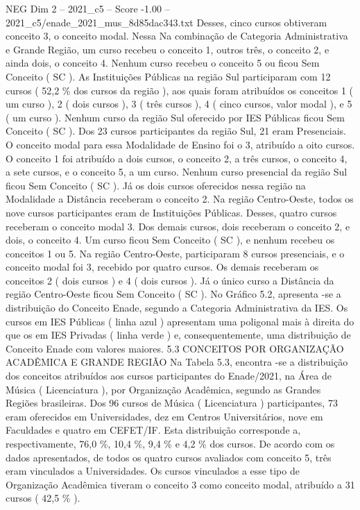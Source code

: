 \begin{textsample}{NEG Dim 2 – 2021\_c5 – Score -1.00 – 2021\_c5/enade\_2021\_mus\_8d85dac343.txt}
Desses, cinco cursos obtiveram conceito 3, o conceito modal.
Nessa Na combinação de Categoria Administrativa e Grande Região, um curso recebeu o conceito 1, outros três, o conceito 2, e ainda dois, o conceito 4.
Nenhum curso recebeu o conceito 5 ou ficou Sem Conceito ( SC ).
As Instituições Públicas na região Sul participaram com 12 cursos ( 52,2 \% dos cursos da região ), aos quais foram atribuídos os conceitos 1 ( um curso ), 2 ( dois cursos ), 3 ( três cursos ), 4 ( cinco cursos, valor modal ), e 5 ( um curso ).
Nenhum curso da região Sul oferecido por IES Públicas ficou Sem Conceito ( SC ).
Dos 23 cursos participantes da região Sul, 21 eram Presenciais.
O conceito modal para essa Modalidade de Ensino foi o 3, atribuído a oito cursos.
O conceito 1 foi atribuído a dois cursos, o conceito 2, a três cursos, o conceito 4, a sete cursos, e o conceito 5, a um curso.
Nenhum curso presencial da região Sul ficou Sem Conceito ( SC ).
Já os dois cursos oferecidos nessa região na Modalidade a Distância receberam o conceito 2.
Na região Centro-Oeste, todos os nove cursos participantes eram de Instituições Públicas.
Desses, quatro cursos receberam o conceito modal 3.
Dos demais cursos, dois receberam o conceito 2, e dois, o conceito 4.
Um curso ficou Sem Conceito ( SC ), e nenhum recebeu os conceitos 1 ou 5.
Na região Centro-Oeste, participaram 8 cursos presenciais, e o conceito modal foi 3, recebido por quatro cursos.
Os demais receberam os conceitos 2 ( dois cursos ) e 4 ( dois cursos ).
Já o único curso a Distância da região Centro-Oeste ficou Sem Conceito ( SC ).
No Gráfico 5.2, apresenta -se a distribuição do Conceito Enade, segundo a Categoria Administrativa da IES.
Os cursos em IES Públicas ( linha azul ) apresentam uma poligonal mais à direita do que os em IES Privadas ( linha verde ) e, consequentemente, uma distribuição de Conceito Enade com valores maiores. 5.3 CONCEITOS POR ORGANIZAÇÃO ACADÊMICA E GRANDE REGIÃO Na Tabela 5.3, encontra -se a distribuição dos conceitos atribuídos aos cursos participantes do Enade/2021, na Área de Música ( Licenciatura ), por Organização Acadêmica, segundo as Grandes Regiões brasileiras.
Dos 96 cursos de Música ( Licenciatura ) participantes, 73 eram oferecidos em Universidades, dez em Centros Universitários, nove em Faculdades e quatro em CEFET/IF.
Esta distribuição corresponde a, respectivamente, 76,0 \%, 10,4 \%, 9,4 \% e 4,2 \% dos cursos.
De acordo com os dados apresentados, de todos os quatro cursos avaliados com conceito 5, três eram vinculados a Universidades.
Os cursos vinculados a esse tipo de Organização Acadêmica tiveram o conceito 3 como conceito modal, atribuído a 31 cursos ( 42,5 \% ).

\end{textsample}

